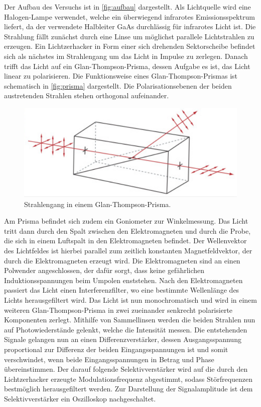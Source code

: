 Der Aufbau des Versuchs ist in \autoref{fig:aufbau} dargestellt.
Als Lichtquelle wird eine Halogen-Lampe verwendet, welche ein überwiegend infrarotes Emissionsspektrum liefert, da der verwendete Halbleiter
GaAs durchlässig für infrarotes Licht ist.
Die Strahlung fällt zunächst durch eine Linse um möglichst parallele Lichtstrahlen zu erzeugen.
Ein Lichtzerhacker in Form einer sich drehenden Sektorscheibe befindet sich als nächstes im Strahlengang um das Licht in Impulse zu zerlegen.
Danach trifft das Licht auf ein Glan-Thompson-Prisma, dessen Aufgabe es ist, das Licht linear zu polarisieren.
Die Funktionsweise eines Glan-Thompson-Prismas ist schematisch in \autoref{fig:prisma} dargestellt. Die Polarisationsebenen der beiden
austretenden Strahlen stehen orthogonal aufeinander.
\begin{figure}[H]
    \centering
    \includegraphics[scale=0.35]{Abbildungen/prisma.png}
    \caption{Strahlengang in einem Glan-Thompson-Prisma.\cite{Prisma}}
    \label{fig:prisma}
\end{figure}
Am Prisma befindet sich zudem ein Goniometer zur Winkelmessung.
Das Licht tritt dann durch den Spalt zwischen den Elektromagneten und durch die Probe, die sich in einem Luftspalt in den Elektromagneten
befindet.
Der Wellenvektor des Lichtfeldes ist hierbei parallel zum zeitlich konstanten Magnetfeldvektor, der durch die Elektromagneten erzeugt wird.
Die Elektromagneten sind an einen Polwender angeschlossen, der dafür sorgt, dass keine gefährlichen Induktionsspannungen beim Umpolen enststehen.
Nach den Elektromagneten passiert das Licht einen Interferenzfilter, wo eine bestimmte Wellenlänge des Lichts herausgefiltert wird.
Das Licht ist nun monochromatisch und wird in einem weiteren Glan-Thompson-Prisma in
zwei zueinander senkrecht polarisierte Komponenten zerlegt.
Mithilfe von Sammellinsen werden die beiden Strahlen nun auf Photowiederstände gelenkt, welche die Intensität messen.
Die entstehenden Signale gelangen nun an einen Differenzverstärker, dessen Ausgangsspannung proportional zur Differenz der beiden Eingangsspannungen
ist und somit verschwindet, wenn beide Eingangsspannungen in Betrag und Phase übereinstimmen.
Der darauf folgende Selektivverstärker wird auf die durch den Lichtzerhacker erzeugte
Modulationsfrequenz abgestimmt, sodass Störfrequenzen bestmöglich herausgefiltert werden.
Zur Darstellung der Signalamplitude ist dem Selektivverstärker ein Oszilloskop nachgeschaltet.

